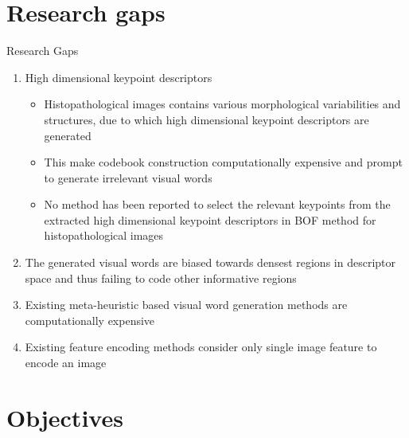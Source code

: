 \documentclass [9pt,times] {beamer}
\begin{document}
\section{Research gaps} 
\begin{frame}{Research Gaps}
\begin{enumerate}
	\justifying
\item  High dimensional keypoint descriptors \\[0.3cm]
\begin{itemize}
\item Histopathological images contains various morphological variabilities and structures, due to which high dimensional keypoint descriptors are generated \\[0.2cm]

\item This make codebook construction computationally expensive and prompt to generate irrelevant visual words \\[0.2cm]%

\item No method has been reported to select the relevant keypoints from the extracted high dimensional keypoint descriptors in BOF method for histopathological images
\end{itemize}
\item The generated visual words are biased towards densest regions in descriptor space and thus failing to code other informative regions \\[0.2cm]%
\item Existing meta-heuristic based visual word generation methods are computationally expensive \\[0.2cm]
\item Existing feature encoding methods consider only single image feature to encode an image %

\end{enumerate}
\end{frame}


\section{Objectives}
\end{document}
